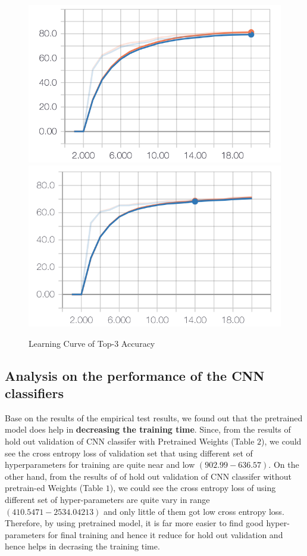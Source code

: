 \documentclass{article}
\begin{document}
\begin{figure}[h]
  \centering
  \includegraphics[scale=0.7]{top_3_acc_sc.png}
  \includegraphics[scale=0.7]{top_3_acc_pre.png}
  \caption{Learning Curve of Top-3 Accuracy}
\end{figure}


\subsection{Analysis on the performance of the CNN classifiers}

Base on the results of the empirical test results, we found out that the pretrained model does help in \textbf{decreasing the training time}. Since, from the results of hold out validation of CNN classifer with Pretrained Weights (Table $2$), we could see the cross entropy loss of validation set that using different set of hyperparameters for training are quite near and low $(902.99-636.57)$. On the other hand, from the results of of hold out validation of CNN classifer without pretrain-ed Weights (Table $1$), we could see the cross entropy loss of using different set of hyper-parameters are quite vary in range $(410.5471-2534.04213)$ and only little of them got low cross entropy loss. Therefore, by using pretrained model, it is far more easier to find good hyper-parameters for final training and hence it reduce for hold out validation and hence helps in decrasing the training time.
\end{document}

